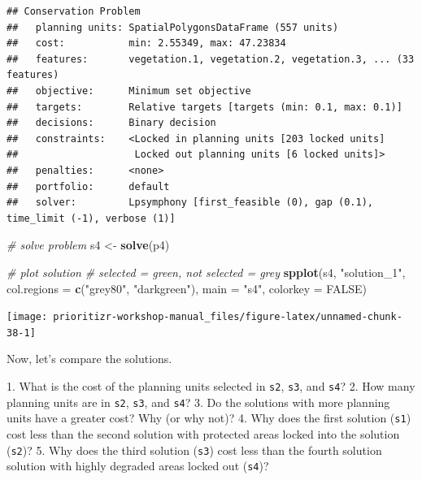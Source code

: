 \documentclass[12pt,]{book}
\makeatletter
\newenvironment{Shaded}{\begin{snugshade}}{\end{snugshade}}
\newcommand{\KeywordTok}[1]{\textcolor[rgb]{0.13,0.29,0.53}{\textbf{#1}}}
\newcommand{\DataTypeTok}[1]{\textcolor[rgb]{0.13,0.29,0.53}{#1}}
\newcommand{\StringTok}[1]{\textcolor[rgb]{0.31,0.60,0.02}{#1}}
\newcommand{\CommentTok}[1]{\textcolor[rgb]{0.56,0.35,0.01}{\textit{#1}}}
\newcommand{\OtherTok}[1]{\textcolor[rgb]{0.56,0.35,0.01}{#1}}
\newcommand{\NormalTok}[1]{#1}
\newenvironment{kframe}{%
\medskip{}
\setlength{\fboxsep}{.8em}
 \def\at@end@of@kframe{}%
 \ifinner\ifhmode%
  \def\at@end@of@kframe{\end{minipage}}%
  \begin{minipage}{\columnwidth}%
 \fi\fi%
 \def\FrameCommand##1{\hskip\@totalleftmargin \hskip-\fboxsep
 \colorbox{shadecolor}{##1}\hskip-\fboxsep
     \hskip-\linewidth \hskip-\@totalleftmargin \hskip\columnwidth}%
 \MakeFramed {\advance\hsize-\width
   \@totalleftmargin\z@ \linewidth\hsize
   \@setminipage}}%
 {\par\unskip\endMakeFramed%
 \at@end@of@kframe}
\newenvironment{rmdblock}[1]
  {
  \begin{itemize}
  \renewcommand{\labelitemi}{
    \raisebox{-.7\height}[0pt][0pt]{
      {\setkeys{Gin}{width=3em,keepaspectratio}\texttt{[image: images/\#1]}}
    }
  }
  \setlength{\fboxsep}{1em}
  \begin{kframe}
  \item
  }
  {
  \end{kframe}
  \end{itemize}
  }
\newenvironment{rmdquestion}
  {\begin{rmdblock}{question}}
  {\end{rmdblock}}
\makeatother
\begin{document}
\begin{verbatim}
## Conservation Problem
##   planning units: SpatialPolygonsDataFrame (557 units)
##   cost:           min: 2.55349, max: 47.23834
##   features:       vegetation.1, vegetation.2, vegetation.3, ... (33 features)
##   objective:      Minimum set objective 
##   targets:        Relative targets [targets (min: 0.1, max: 0.1)]
##   decisions:      Binary decision 
##   constraints:    <Locked in planning units [203 locked units]
##                    Locked out planning units [6 locked units]>
##   penalties:      <none>
##   portfolio:      default
##   solver:         Lpsymphony [first_feasible (0), gap (0.1), time_limit (-1), verbose (1)]
\end{verbatim}

\begin{Shaded}
\begin{Highlighting}[]
\CommentTok{# solve problem}
\NormalTok{s4 <-}\StringTok{ }\KeywordTok{solve}\NormalTok{(p4)}

\CommentTok{# plot solution}
\CommentTok{# selected = green, not selected = grey}
\KeywordTok{spplot}\NormalTok{(s4, }\StringTok{"solution_1"}\NormalTok{, }\DataTypeTok{col.regions =} \KeywordTok{c}\NormalTok{(}\StringTok{"grey80"}\NormalTok{, }\StringTok{"darkgreen"}\NormalTok{), }\DataTypeTok{main =} \StringTok{"s4"}\NormalTok{,}
       \DataTypeTok{colorkey =} \OtherTok{FALSE}\NormalTok{)}
\end{Highlighting}
\end{Shaded}

\begin{center}\texttt{[image: prioritizr-workshop-manual\_files/figure-latex/unnamed-chunk-38-1]} \end{center}

\clearpage

Now, let's compare the solutions.

\begin{rmdquestion} 1. What is the cost of the planning units
selected in \texttt{s2}, \texttt{s3}, and \texttt{s4}? 2. How many
planning units are in \texttt{s2}, \texttt{s3}, and \texttt{s4}? 3. Do
the solutions with more planning units have a greater cost? Why (or why
not)? 4. Why does the first solution (\texttt{s1}) cost less than the
second solution with protected areas locked into the solution
(\texttt{s2})? 5. Why does the third solution (\texttt{s3}) cost less
than the fourth solution solution with highly degraded areas locked out
(\texttt{s4})? \end{rmdquestion}
\end{document}
